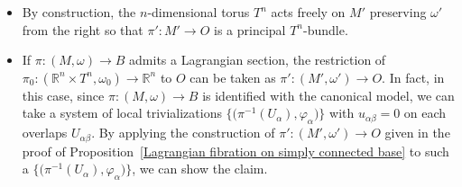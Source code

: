 \documentclass[pdftex]{sigma}
\numberwithin{equation}{section}
\newcommand{\R}{\mathbb{R}}
\begin{document}
\begin{Remark}\label{remarks on M'}\quad
\begin{itemize}\itemsep=0pt
\item[(1)] By construction, the $n$-dimensional torus $T^n$ acts freely on $M'$ preserving $\omega'$ from the right so that $\pi'\colon M'\to O$ is a principal $T^n$-bundle.
\item[(2)] If $\pi\colon (M,\omega)\to B$ admits a Lagrangian section, the restriction of $\pi_0\colon {(\R^n\times T^n,\omega_0)\to \R^n}$ to $O$ can be taken as $\pi'\colon (M',\omega')\to O$. In fact, in this case, since $\pi\colon (M,\omega)\to B$ is identified with the canonical model, we can take a system of local trivializations $\big\{\bigl(\pi^{-1}(U_\alpha),\varphi_\alpha\bigr)\big\}$ with $u_{\alpha\beta}=0$ on each overlaps $U_{\alpha\beta}$. By applying the construction of $\pi'\colon (M',\omega')\to O$ given in the proof of Proposition~\ref{Lagrangian fibration on simply connected base} to such a $\big\{\bigl(\pi^{-1}(U_\alpha),\varphi_\alpha\bigr)\big\}$, we can show the claim.
\end{itemize}
\end{Remark}
\end{document}
